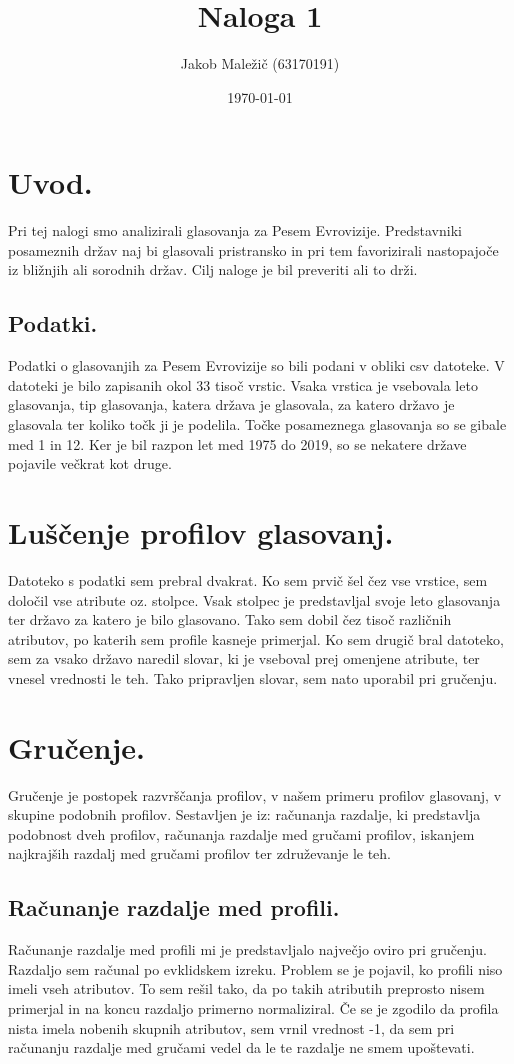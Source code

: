 \documentclass[a4paper,11pt]{article}
\title{Naloga 1}
\author{Jakob Maležič (63170191)}
\date{\today}
\begin{document}
\maketitle

\section{Uvod.}
Pri tej nalogi smo analizirali glasovanja za Pesem Evrovizije. Predstavniki posameznih držav naj bi glasovali pristransko in pri tem favorizirali nastopajoče iz bližnjih ali sorodnih držav. Cilj naloge je bil preveriti ali to drži.

\subsection{Podatki.}
Podatki o glasovanjih za Pesem Evrovizije so bili podani v obliki csv datoteke. V datoteki je bilo zapisanih okol 33 tisoč vrstic. Vsaka vrstica je vsebovala leto glasovanja, tip glasovanja, katera država je glasovala, za katero državo je glasovala ter koliko točk ji je podelila. Točke posameznega glasovanja so se gibale med 1 in 12. Ker je bil razpon let med 1975 do 2019, so se nekatere države pojavile večkrat kot druge.

\section{Luščenje profilov glasovanj.}
Datoteko s podatki sem prebral dvakrat. Ko sem prvič šel čez vse vrstice, sem določil vse atribute oz. stolpce. Vsak stolpec je predstavljal svoje leto glasovanja ter državo za katero je bilo glasovano. Tako sem dobil čez tisoč različnih atributov, po katerih sem profile kasneje primerjal. Ko sem drugič bral datoteko, sem za vsako državo naredil slovar, ki je vseboval prej omenjene atribute, ter vnesel vrednosti le teh. Tako pripravljen slovar, sem nato uporabil pri gručenju.

\section{Gručenje.}
Gručenje je postopek razvrščanja profilov, v našem primeru profilov glasovanj, v skupine podobnih profilov. Sestavljen je iz: računanja razdalje, ki predstavlja podobnost dveh profilov, računanja razdalje med gručami profilov, iskanjem najkrajših razdalj med gručami profilov ter združevanje le teh.

\subsection{Računanje razdalje med profili.}
Računanje razdalje med profili mi je predstavljalo največjo oviro pri gručenju. Razdaljo sem računal po evklidskem izreku. Problem se je pojavil, ko profili niso imeli vseh atributov. To sem rešil tako, da po takih atributih preprosto nisem primerjal in na koncu razdaljo primerno normaliziral. Če se je zgodilo da profila nista imela nobenih skupnih atributov, sem vrnil vrednost -1, da sem pri računanju razdalje med gručami vedel da le te razdalje ne smem upoštevati.
\end{document}
